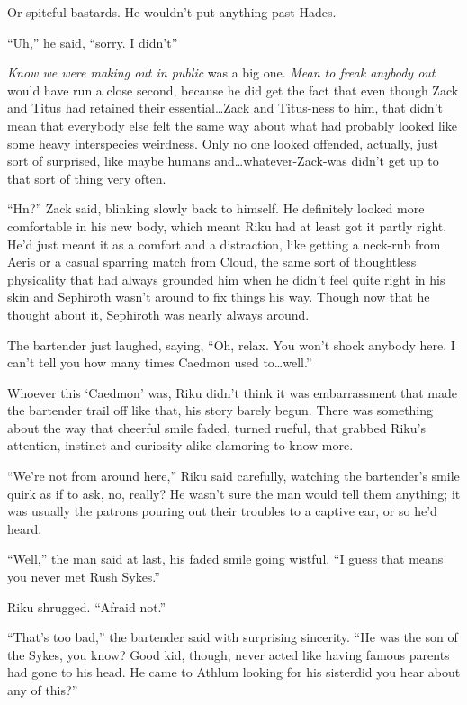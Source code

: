 Or spiteful bastards. He wouldn't put anything past Hades.

``Uh,'' he said, ``sorry. I didn't\textemdash''

\emph{Know we were making out in public} was a big one. \emph{Mean to freak anybody out} would have run a close second, because he did get the fact that even though Zack and Titus had retained their essential\ldots Zack and Titus-ness to him, that didn't mean that everybody else felt the same way about what had probably looked like some heavy interspecies weirdness. Only no one looked offended, actually, just sort of surprised, like maybe humans and\ldots whatever-Zack-was didn't get up to that sort of thing very often.

``Hn?'' Zack said, blinking slowly back to himself. He definitely looked more comfortable in his new body, which meant Riku had at least got it partly right. He'd just meant it as a comfort and a distraction, like getting a neck-rub from Aeris or a casual sparring match from Cloud, the same sort of thoughtless physicality that had always grounded him when he didn't feel quite right in his skin and Sephiroth wasn't around to fix things his way. Though now that he thought about it, Sephiroth was nearly always around.

The bartender just laughed, saying, ``Oh, relax. You won't shock anybody here. I can't tell you how many times Caedmon used to\ldots well.''

Whoever this `Caedmon' was, Riku didn't think it was embarrassment that made the bartender trail off like that, his story barely begun. There was something about the way that cheerful smile faded, turned rueful, that grabbed Riku's attention, instinct and curiosity alike clamoring to know more.

``We're not from around here,'' Riku said carefully, watching the bartender's smile quirk as if to ask, no, really? He wasn't sure the man would tell them anything; it was usually the patrons pouring out their troubles to a captive ear, or so he'd heard.

``Well,'' the man said at last, his faded smile going wistful. ``I guess that means you never met Rush Sykes.''

Riku shrugged. ``Afraid not.''

``That's too bad,'' the bartender said with surprising sincerity. ``He was the son of the Sykes, you know? Good kid, though, never acted like having famous parents had gone to his head. He came to Athlum looking for his sister\textemdash did you hear about any of this?''

